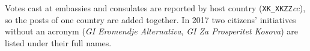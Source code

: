 Votes cast at embassies and consulates are reported by host country
(\texttt{XK\_XKZZ}\textit{cc}), so the posts of one country are added together.
In 2017 two
citizens' initiatives without an acronym (\textit{GI Eromendje Alternativa},
\textit{GI Za Prosperitet Kosova}) are listed under their full names.
